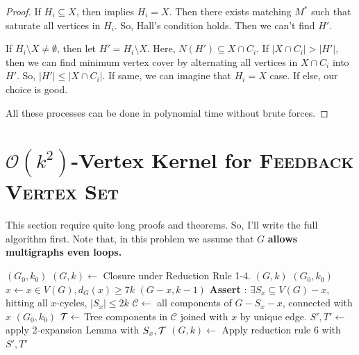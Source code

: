 \documentclass[12pt, a4paper, openany, twoside]{book}
\theoremstyle{definition}
\theoremstyle{remark}
\newcommand{\CC}{{\mathcal {C}}} \newcommand{\CD}{{\mathcal {D}}}
\newcommand{\CO}{{\mathcal {O}}} \newcommand{\CP}{{\mathcal {P}}}
\theoremstyle{plain}
\numberwithin{equation}{section}
\begin{document}
\begin{proof}
If $H_i \subseteq X$, then implies $H_i = X$. Then there exists matching $M^*$ such that saturate all vertices in $H_i$. So, Hall's condition holds. 
Then we can't find $H'$. 

If $H_i \setminus X \neq \emptyset$, then let $H' = H_i \setminus X$. 
Here, $N(H') \subseteq X \cap C_i$. If $|X \cap C_i| > |H'|$, then we can find minimum vertex cover by alternating 
all vertices in $X \cap C_i$ into $H'$. So, $|H'| \leq |X \cap C_i|$. If same, we can imagine that $H_i = X$ case. If else, our choice is good. 

All these processes can be done in polynomial time without brute forces. 

\end{proof}


\newpage 

\section{$\CO(k^2)$-Vertex Kernel for \textsc{Feedback Vertex Set}}

This section require quite long proofs and theorems. So, I'll write the full algorithm first. 
Note that, in this problem we assume that $G$ \textbf{allows multigraphs even loops.}

\begin{algorithm}
    
\caption{$\CO(k^2)$-kernelization for Feedback Vertex Set}

\begin{algorithmic}[1]
 \Return $(G_0, k_0)$ 
\EndIf
\State $(G, k) \gets $ Closure under Reduction Rule 1-4.
 \Return $(G, k)$ 
 \Return $(G_0, k_0)$ 
\Else  
\State $x \gets x \in V(G), d_G(x) \geq 7k$
 \Return $(G - x, k - 1)$  
\Else    
\State \textbf{Assert} : $\exists S_x \subseteq V(G) - x$, hitting all $x$-cycles, $|S_x| \leq 2k$
\State $\CC \gets $ all components of $G - S_x - x$, connected with $x$
\If{$\CC$ has more than $k$ cycles} \Return $(G_0, k_0)$
\Else   
\State ${\mathcal {T}} \gets$ Tree components in $\CC$ joined with $x$ by unique edge.
\State $S', T' \gets$ apply 2-expansion Lemma with $S_x, {\mathcal {T}}$
\State \Return $(G, k) \gets$ Apply reduction rule 6 with $S', T'$
\EndIf
\EndIf 
\EndIf
\EndProcedure
\end{algorithmic}

\end{algorithm}
\end{document}
